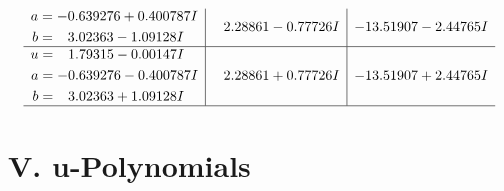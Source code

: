 \documentclass[1p]{elsarticle_modified}
\theoremstyle{definition}
\begin{document}
$$\begin{array}{c|c|c}
\begin{aligned}
a &= -0.639276 + 0.400787 I \\
b &= \phantom{-}3.02363 - 1.09128 I\end{aligned}
 & \phantom{-}2.28861 - 0.77726 I & -13.51907 - 2.44765 I \\ \hline\begin{aligned}
u &= \phantom{-}1.79315 - 0.00147 I \\
a &= -0.639276 - 0.400787 I \\
b &= \phantom{-}3.02363 + 1.09128 I\end{aligned}
 & \phantom{-}2.28861 + 0.77726 I & -13.51907 + 2.44765 I\\
 \hline 
 \end{array}$$\newpage
\newpage\renewcommand{\arraystretch}{1}
\centering \section*{ V. u-Polynomials}
\end{document}
